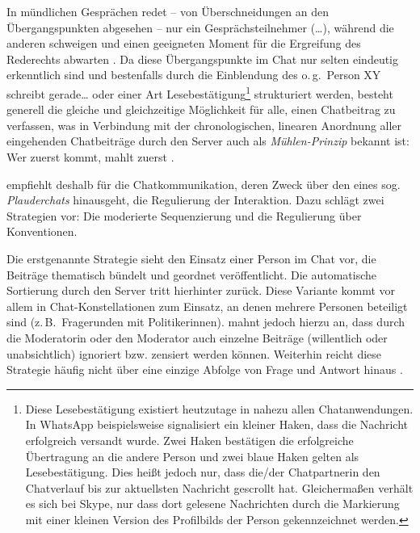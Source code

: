 In mündlichen Gesprächen redet \glqq -- von Überschneidungen an den Übergangspunkten abgesehen -- nur ein Gesprächsteilnehmer (\dots), während die anderen schweigen und einen geeigneten Moment für die Ergreifung des Rederechts abwarten\grqq{} \citep[453]{storrer_getippte_2001}. Da diese Übergangspunkte im Chat nur selten eindeutig erkenntlich sind und bestenfalls durch die Einblendung des o.\,g.\ \glqq Person XY schreibt gerade\dots\grqq{} oder einer Art Lesebestätigung\footnote{Diese Lesebestätigung existiert heutzutage in nahezu allen Chatanwendungen. In WhatsApp beispielsweise signalisiert ein kleiner Haken, dass die Nachricht erfolgreich versandt wurde. Zwei Haken bestätigen die erfolgreiche Übertragung an die andere Person und zwei blaue Haken gelten als Lesebestätigung. Dies heißt jedoch nur, dass die/der Chatpartner{\textperiodcentered}in den Chatverlauf bis zur aktuellsten Nachricht gescrollt hat. Gleichermaßen verhält es sich bei Skype, nur dass dort \glqq gelesene\grqq{} Nachrichten durch die Markierung mit einer kleinen Version des Profilbilds der Person gekennzeichnet werden.} strukturiert werden, besteht generell die gleiche und gleichzeitige Möglichkeit für alle, einen Chatbeitrag zu verfassen, was in Verbindung mit der chronologischen, linearen Anordnung aller eingehenden Chatbeiträge durch den Server auch als \emph{Mühlen-Prinzip} bekannt ist: \glqq Wer zuerst kommt, mahlt zuerst\grqq{} \citep[452]{storrer_getippte_2001}.

\citeauthor{storrer_sprachliche_2001} empfiehlt deshalb für die Chatkommunikation, deren Zweck über den eines sog. \emph{Plauderchats} hinausgeht, die Regulierung der Interaktion. Dazu schlägt \citet[13]{storrer_sprachliche_2001} zwei Strategien vor: \glqq Die moderierte Sequenzierung und die Regulierung über Konventionen\grqq{}.

Die erstgenannte Strategie sieht den Einsatz einer Person im Chat vor, die Beiträge thematisch bündelt und geordnet veröffentlicht. Die automatische Sortierung durch den Server tritt hierhinter zurück. Diese Variante kommt vor allem in Chat-Konstellationen zum Einsatz, an denen mehrere Personen beteiligt sind (z.\,B.\ Fragerunden mit Politiker{\textperiodcentered}innen). \citeauthor{storrer_sprachliche_2001} mahnt jedoch hierzu an, dass durch die Moderatorin oder den Moderator auch einzelne Beiträge (willentlich oder unabsichtlich) ignoriert bzw. zensiert werden können. Weiterhin reicht diese Strategie häufig nicht über eine einzige Abfolge von Frage und Antwort hinaus \citep[13\psq]{storrer_sprachliche_2001}.

